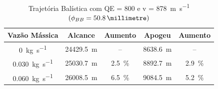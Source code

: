\begin{table}[ht]
\centering
\caption[Trajetória Balística com QE = \qty{800}{\milliradian} e v = \qty{878}{\metre\per\second} \(\left(\phi_{BB} = \qty{50,8}{\millimetre}\right)\)]{Trajetória Balística com QE = \qty{800}{\milliradian} e v = \qty[per-mode = symbol]{878}{\metre\per\second} \(\left(\phi_{BB} = \qty{50,8}{\millimetre}\right)\)}
\vspace{0.5cm}
\begin{tabular}{c|c|c|c|c}
Vazão Mássica & Alcance & Aumento & Apogeu & Aumento \\
\hline
\qty{0}{\kilogram\per\second} & \qty{24429,5}{\metre} & -- & \qty{8638,6}{\metre} & -- \\ 
\qty{0,030}{\kilogram\per\second} & \qty{25030,7}{\metre} & \qty{2,5}{\percent} & \qty{8892,7}{\metre} & \qty{2,9}{\percent} \\
\qty{0,060}{\kilogram\per\second} & \qty{26008,5}{\metre} & \qty{6,5}{\percent} & \qty{9084,5}{\metre} & \qty{5,2}{\percent}
\end{tabular}
\label{tab:tabela-800mil-bb-2pol}
\end{table}
